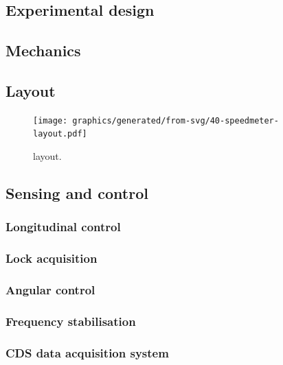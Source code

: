 \subsection{Experimental design}

\subsection{Mechanics}

\subsection{Layout}

\begin{figure}
  \centering
  \texttt{[image: graphics/generated/from-svg/40-speedmeter-layout.pdf]}
  \caption[\SSMEXPT{} layout]{\label{fig:ssm-layout}\SSMEXPT{} layout.}
\end{figure}

\subsection{Sensing and control}

\subsubsection{Longitudinal control}

\subsubsection{Lock acquisition}

\subsubsection{Angular control}

\subsubsection{Frequency stabilisation}

\subsubsection{\label{sec:cds}CDS data acquisition system}

